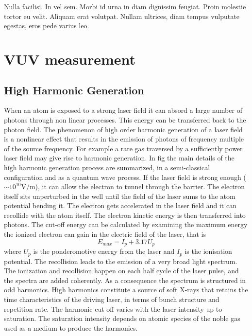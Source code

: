 \begin{savequote}[75mm] 
Nulla facilisi. In vel sem. Morbi id urna in diam dignissim feugiat. Proin molestie tortor eu velit. Aliquam erat volutpat. Nullam ultrices, diam tempus vulputate egestas, eros pede varius leo.
\end{savequote}

\chapter{VUV measurement}

\section{High Harmonic Generation}
When an atom is exposed to a strong laser field it can absord a large number of photons through non linear processes. This energy can be transferred back to the photon field.
The phenomenon of high order harmonic generation of a laser field is a nonlinear effect that results in the emission of photons of frequency multiple of the source frequency. For example a rare gas traversed by a sufficiently power laser field may give rise to harmonic generation.
In fig
the main details of the high harmonic generation process are summarized, in a semi-classical configuration and as a quantum wave process.
If the laser field is strong enough ($\sim 10^{10}$V/m), it can allow the electron to tunnel through the barrier. The electron itself sits unperturbed in the well until the field of the laser sums to the atom potential bending it.
The electron gets accelerated in the laser field and it can recollide with the atom itself. The electron kinetic energy is then transferred into photons.
The cut-off energy can be calculated by examining the maximum energy the ionized electron can gain in the electric field of the laser, that is
\begin{equation}
E_{max} = I_{p}+3.17U_{p}
\end{equation}
where $U_{p}$ is the ponderomotive energy from the laser and $I_{p}$ is the ionisation potential. The recollision leads to the emission of a very broad light spectrum.
The ionization and recollision happen on each half cycle of the laser pulse, and the spectra are added coherently. As a consequence the spectrum is structured in odd harmonics.
High harmonics constitute a source of soft X-rays that retains the time characteristics of the driving laser, in terms of bunch structure and repetition rate. 
The harmonic cut off varies with the laser intensity up to saturation. The saturation intensity depends on atomic species of the noble gas used as a medium to produce the harmonics.

